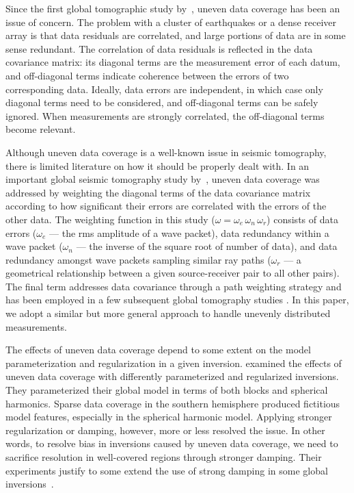 Since the first global tomographic study by~\cite{Dziewonski77}, uneven data coverage has been an issue of concern. 
The problem with a cluster of earthquakes or a dense receiver array is that data residuals are correlated, and large portions of data are in some sense redundant.  %
The correlation of data residuals is reflected in the data covariance matrix: 
its diagonal terms are the measurement error of each datum, and off-diagonal 
terms indicate coherence between the errors of two corresponding data.
Ideally, data errors are independent, in which case only diagonal terms
need to be considered, and off-diagonal terms can be safely ignored.  When measurements are strongly 
correlated, the off-diagonal terms become relevant.  

Although uneven data coverage is a well-known issue in seismic tomography,
there is limited literature on how it should be properly dealt with.
In an important global seismic tomography study by~\cite{Li1996}, uneven data coverage was addressed by weighting the diagonal terms of the data covariance matrix according to how significant 
their errors are correlated with the errors of the other data.
The weighting function 
in this study ($\omega = \omega_e\, \omega_n  \,\omega_r$) consists of data errors 
($\omega_e$ --- the rms amplitude of a wave packet), data redundancy within a wave packet ($\omega_n$ --- the inverse of the square root of number of data), and data redundancy 
amongst wave packets sampling similar ray paths 
($\omega_r$ --- a geometrical relationship between a given source-receiver 
pair to all other pairs).
The final term addresses data covariance through a path weighting strategy and has been employed in a few subsequent global tomography studies \cite{SchaefferLebedev13}.  
In this paper, we adopt a similar but more general approach to handle unevenly distributed measurements.  

The effects of uneven data coverage depend to some extent on the model parameterization and 
regularization in a given inversion.  \cite{Boschi1999} examined the effects of uneven data 
coverage with differently parameterized and regularized inversions. They parameterized their global 
model in terms of both blocks and spherical harmonics.
Sparse data coverage in the southern hemisphere
produced fictitious model features, especially in the spherical harmonic model.
Applying stronger 
regularization or damping, however, more or less resolved the issue.
In other words, to resolve bias in inversions caused by uneven data coverage, we need to sacrifice resolution in well-covered regions through stronger damping.
Their experiments justify to some extend the use of 
strong damping in some global inversions~\cite{Masters1996,Antolik2003}.      

